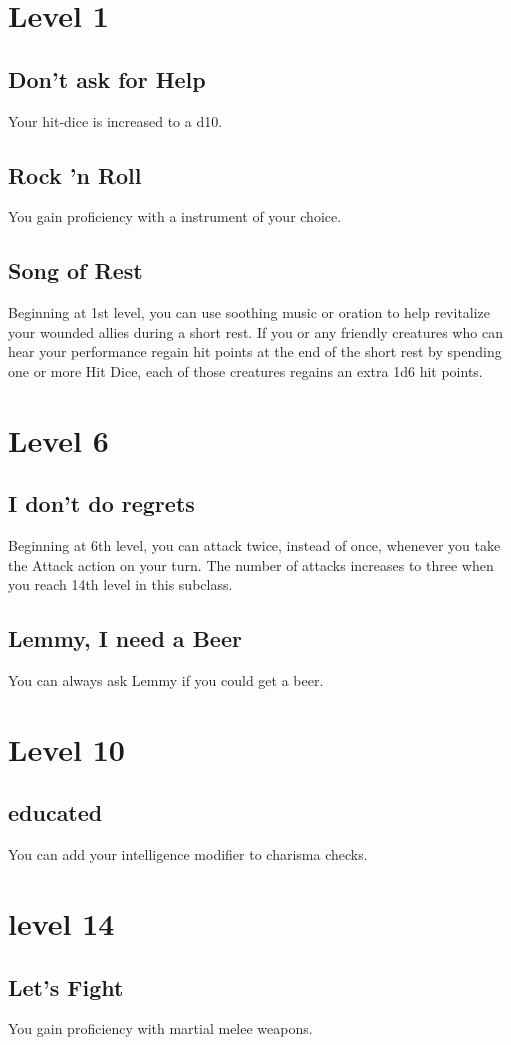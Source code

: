 \documentclass[a4paper,10pt,twoside,twocolumn]{dndbook} %
\begin{document}
	\section{Level 1}
	\subsection{Don't ask for Help}
	Your hit-dice is increased to a d10.
	\subsection{Rock 'n Roll}
	You gain proficiency with a instrument of your choice.
	\subsection{Song of Rest}
	Beginning at 1st level, you can use soothing music or oration to help revitalize your wounded allies during a short rest. If you or any friendly creatures who can hear your performance regain hit points at the end of the short rest by spending one or more Hit Dice, each of those creatures regains an extra 1d6 hit points.
	\section{Level 6}
	\subsection{I don't do regrets}
	Beginning at 6th level, you can attack twice, instead of once, whenever you take the Attack action on your turn. The number of attacks increases to three when you reach 14th level in this subclass.
	\subsection{Lemmy, I need a Beer}
	You can always ask Lemmy if you could get a beer.
	\section{Level 10}
	\subsection{educated}
	You can add your intelligence modifier to charisma checks.
	\section{level 14}
	\subsection{Let's Fight}
	You gain proficiency with martial melee weapons.
\end{document}

